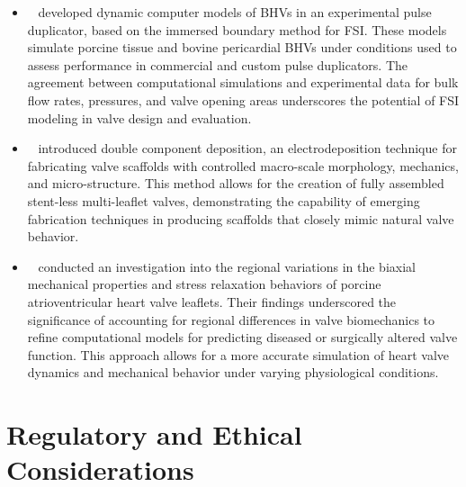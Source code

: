\begin{itemize}
    \item  ~ developed dynamic computer models of \gls{BHV}s in an experimental pulse duplicator, based on the immersed boundary method for \gls{FSI}. These models simulate porcine tissue and bovine pericardial BHVs under conditions used to assess performance in commercial and custom pulse duplicators. The agreement between computational simulations and experimental data for bulk flow rates, pressures, and valve opening areas underscores the potential of \gls{FSI} modeling in valve design and evaluation.
    \item  ~ introduced double component deposition, an electrodeposition technique for fabricating valve scaffolds with controlled macro-scale morphology, mechanics, and micro-structure. This method allows for the creation of fully assembled stent-less multi-leaflet valves, demonstrating the capability of emerging fabrication techniques in producing scaffolds that closely mimic natural valve behavior.
    \item ~ conducted an investigation into the regional variations in the biaxial mechanical properties and stress relaxation behaviors of porcine atrioventricular heart valve leaflets. Their findings underscored the significance of accounting for regional differences in valve biomechanics to refine computational models for predicting diseased or surgically altered valve function. This approach allows for a more accurate simulation of heart valve dynamics and mechanical behavior under varying physiological conditions.
\end{itemize}








\section{Regulatory and Ethical Considerations}

